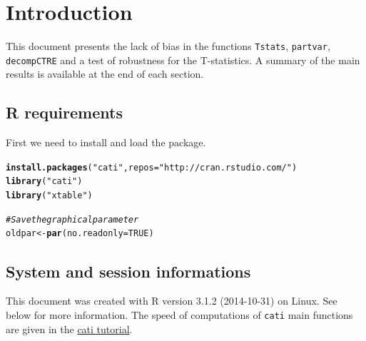 \documentclass[12pt]{article}\usepackage[]{graphicx}\usepackage[]{color}
\makeatletter
\newcommand{\hlnum}[1]{\textcolor[rgb]{0.686,0.059,0.569}{#1}}%
\newcommand{\hlstr}[1]{\textcolor[rgb]{0.192,0.494,0.8}{#1}}%
\newcommand{\hlcom}[1]{\textcolor[rgb]{0.678,0.584,0.686}{\textit{#1}}}%
\newcommand{\hlstd}[1]{\textcolor[rgb]{0.345,0.345,0.345}{#1}}%
\newcommand{\hlkwb}[1]{\textcolor[rgb]{0.69,0.353,0.396}{#1}}%
\newcommand{\hlkwc}[1]{\textcolor[rgb]{0.333,0.667,0.333}{#1}}%
\newcommand{\hlkwd}[1]{\textcolor[rgb]{0.737,0.353,0.396}{\textbf{#1}}}%
\newenvironment{kframe}{%
 \def\at@end@of@kframe{}%
 \ifinner\ifhmode%
  \def\at@end@of@kframe{\end{minipage}}%
  \begin{minipage}{\columnwidth}%
 \fi\fi%
 \def\FrameCommand##1{\hskip\@totalleftmargin \hskip-\fboxsep
 \colorbox{shadecolor}{##1}\hskip-\fboxsep
     \hskip-\linewidth \hskip-\@totalleftmargin \hskip\columnwidth}%
 \MakeFramed {\advance\hsize-\width
   \@totalleftmargin\z@ \linewidth\hsize
   \@setminipage}}%
 {\par\unskip\endMakeFramed%
 \at@end@of@kframe}
\newenvironment{knitrout}{}{} %
\makeatother
\begin{document}
\newpage
\tableofcontents
\newpage


\section{Introduction}
 This document presents the lack of bias in the functions \texttt{Tstats}, \texttt{partvar}, \texttt{decompCTRE} and a test of robustness for the T-statistics. A summary of the main results is available at the end of each section.

\subsection{R requirements}

First we need to install and load the package. 
\begin{knitrout}\small
{}\color{fgcolor}\begin{kframe}
\begin{alltt}
\hlkwd{install.packages}\hlstd{(}\hlstr{"cati"}\hlstd{,} \hlkwc{repos} \hlstd{=} \hlstr{"http://cran.rstudio.com/"}\hlstd{)}
\hlkwd{library}\hlstd{(}\hlstr{"cati"}\hlstd{)}
\hlkwd{library}\hlstd{(}\hlstr{"xtable"}\hlstd{)}

\hlcom{# Save the graphical parameter}
\hlstd{oldpar} \hlkwb{<-} \hlkwd{par}\hlstd{(}\hlkwc{no.readonly} \hlstd{=} \hlnum{TRUE}\hlstd{)}
\end{alltt}
\end{kframe}
\end{knitrout}

  \subsection{System and session informations}
  This document was created with R version 3.1.2 (2014-10-31) on Linux. See below for more information. The speed of computations of \texttt{cati} main functions are given  in the \href{https://github.com/adrientaudiere/cati/blob/Package-cati/Documentation/vignette_Darwin_finches/vignette.pdf}{cati tutorial}.
  
\end{document}
